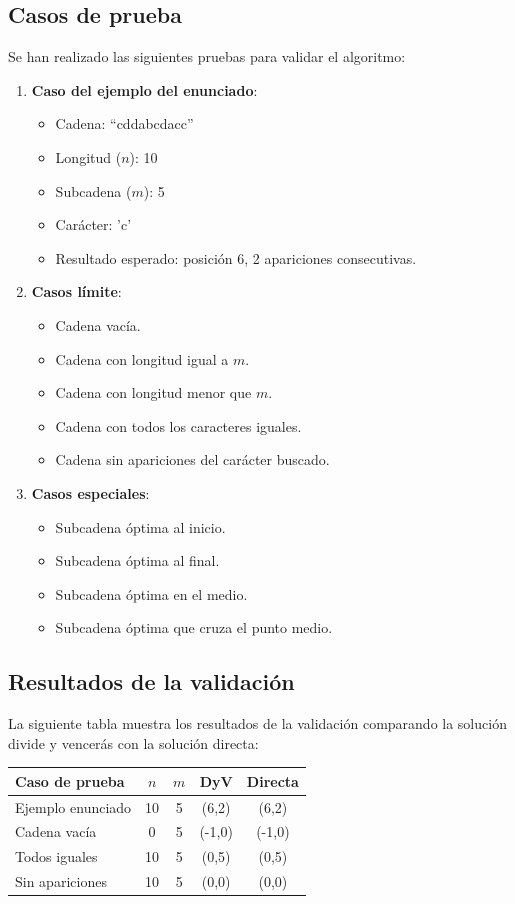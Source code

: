 \documentclass[12pt,a4paper]{article}
\begin{document}
\subsection{Casos de prueba}
Se han realizado las siguientes pruebas para validar el algoritmo:
\begin{enumerate}
    \item \textbf{Caso del ejemplo del enunciado}:
    \begin{itemize}
        \item Cadena: ``cddabcdacc''
        \item Longitud (\(n\)): 10
        \item Subcadena (\(m\)): 5
        \item Carácter: 'c'
        \item Resultado esperado: posición 6, 2 apariciones consecutivas.
    \end{itemize}
    \item \textbf{Casos límite}:
    \begin{itemize}
        \item Cadena vacía.
        \item Cadena con longitud igual a \(m\).
        \item Cadena con longitud menor que \(m\).
        \item Cadena con todos los caracteres iguales.
        \item Cadena sin apariciones del carácter buscado.
    \end{itemize}
    \item \textbf{Casos especiales}:
    \begin{itemize}
        \item Subcadena óptima al inicio.
        \item Subcadena óptima al final.
        \item Subcadena óptima en el medio.
        \item Subcadena óptima que cruza el punto medio.
    \end{itemize}
\end{enumerate}

\subsection{Resultados de la validación}
La siguiente tabla muestra los resultados de la validación comparando la solución divide y vencerás con la solución directa:

\begin{center}
\begin{tabular}{lcccc}
\toprule
\textbf{Caso de prueba} & \textbf{\(n\)} & \textbf{\(m\)} & \textbf{DyV} & \textbf{Directa} \\
\midrule
Ejemplo enunciado & 10 & 5 & (6,2) & (6,2) \\
Cadena vacía & 0 & 5 & (-1,0) & (-1,0) \\
Todos iguales & 10 & 5 & (0,5) & (0,5) \\
Sin apariciones & 10 & 5 & (0,0) & (0,0) \\
\bottomrule
\end{tabular}
\end{center}
\end{document}
